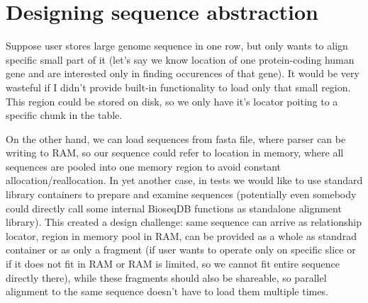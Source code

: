 \raggedbottom
{}

\section{Designing sequence abstraction}
\label{sec:sequence-abstractions}

Suppose user stores large genome sequence in one row, but only wants to align specific small part of it (let's say we know location of one protein-coding human gene and are interested only in finding occurences of that gene).
It would be very wasteful if I didn't provide built-in functionality to load only that small region. This region could be stored on disk, so we only have it's locator poiting to a specific chunk in the table.


On the other hand, we can load sequences from fasta file, where parser can be writing to RAM, so our sequence could refer to location in memory, where all sequences are pooled into one memory region to avoid constant allocation/reallocation.
In yet another case, in tests we would like to use standard library containers to prepare and examine sequences (potentially even somebody could directly call some internal BioseqDB functions as standalone alignment library).
This created a design challenge: same sequence can arrive as relationship locator, region in memory pool in RAM, can be provided as a whole as standrad container or as only a fragment (if user wants to operate only on specific slice or if it does not fit in RAM or RAM is limited, so we cannot fit entire sequence directly there), while
these fragments should also be shareable, so parallel alignment to the same sequence doesn't have to load them multiple times.


